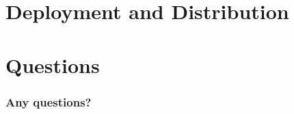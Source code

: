 \documentclass{beamer}
\numberwithin{figure}{section}
\begin{document}
\section{Deployment and Distribution}
%
\section{Questions}
\begin{frame}
    \frametitle{Any questions?}
\end{frame}
\end{document}

